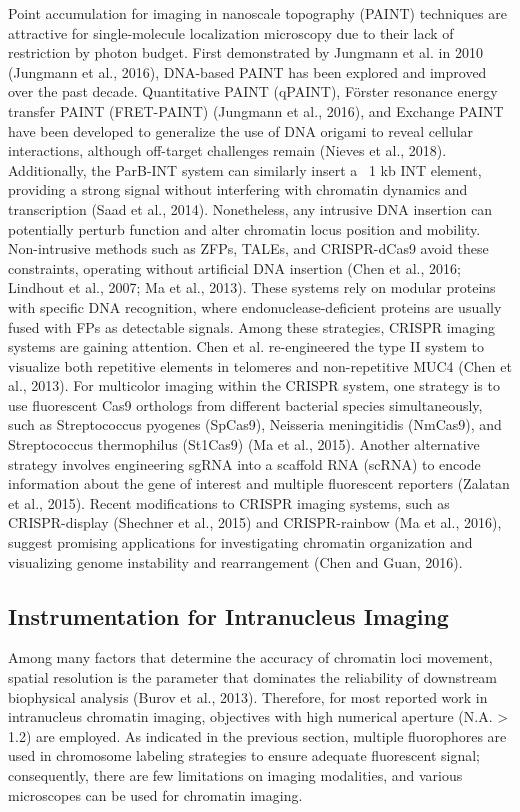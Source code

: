 Point accumulation for imaging in nanoscale topography (PAINT) techniques are attractive for single-molecule localization microscopy due to their lack of restriction by photon budget. First demonstrated by Jungmann et al. in 2010 (Jungmann et al., 2016), DNA-based PAINT has been explored and improved over the past decade. Quantitative PAINT (qPAINT), Förster resonance energy transfer PAINT (FRET-PAINT) (Jungmann et al., 2016), and Exchange PAINT have been developed to generalize the use of DNA origami to reveal cellular interactions, although off-target challenges remain (Nieves et al., 2018). Additionally, the ParB-INT system can similarly insert a ~1 kb INT element, providing a strong signal without interfering with chromatin dynamics and transcription (Saad et al., 2014). Nonetheless, any intrusive DNA insertion can potentially perturb function and alter chromatin locus position and mobility. Non-intrusive methods such as ZFPs, TALEs, and CRISPR-dCas9 avoid these constraints, operating without artificial DNA insertion (Chen et al., 2016; Lindhout et al., 2007; Ma et al., 2013). These systems rely on modular proteins with specific DNA recognition, where endonuclease-deficient proteins are usually fused with FPs as detectable signals. Among these strategies, CRISPR imaging systems are gaining attention. Chen et al. re-engineered the type II system to visualize both repetitive elements in telomeres and non-repetitive MUC4 (Chen et al., 2013). For multicolor imaging within the CRISPR system, one strategy is to use fluorescent Cas9 orthologs from different bacterial species simultaneously, such as Streptococcus pyogenes (SpCas9), Neisseria meningitidis (NmCas9), and Streptococcus thermophilus (St1Cas9) (Ma et al., 2015). Another alternative strategy involves engineering sgRNA into a scaffold RNA (scRNA) to encode information about the gene of interest and multiple fluorescent reporters (Zalatan et al., 2015). Recent modifications to CRISPR imaging systems, such as CRISPR-display (Shechner et al., 2015) and CRISPR-rainbow (Ma et al., 2016), suggest promising applications for investigating chromatin organization and visualizing genome instability and rearrangement (Chen and Guan, 2016).


\subsection{Instrumentation for Intranucleus Imaging}

Among many factors that determine the accuracy of chromatin loci movement, spatial resolution is the parameter that dominates the reliability of downstream biophysical analysis (Burov et al., 2013). Therefore, for most reported work in intranucleus chromatin imaging, objectives with high numerical aperture (N.A. > 1.2) are employed. As indicated in the previous section, multiple fluorophores are used in chromosome labeling strategies to ensure adequate fluorescent signal; consequently, there are few limitations on imaging modalities, and various microscopes can be used for chromatin imaging.

